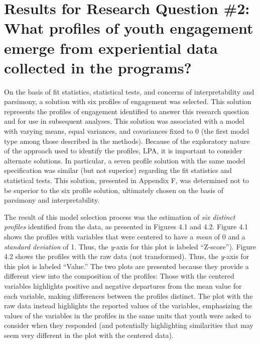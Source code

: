 \documentclass[]{msu-thesis}
\theoremstyle{definition}
\theoremstyle{definition}
\theoremstyle{definition}
\theoremstyle{remark}
\begin{document}
\section{Results for Research Question \#2: What profiles of youth
engagement emerge from experiential data collected in the
programs?}\label{results-for-research-question-2-what-profiles-of-youth-engagement-emerge-from-experiential-data-collected-in-the-programs}

On the basis of fit statistics, statistical tests, and concerns of
interpretability and parsimony, a solution with six profiles of
engagement was selected. This solution represents the profiles of
engagement identified to answer this research question and for use in
subsequent analyses. This solution was associated with a model with
varying means, equal variances, and covariances fixed to 0 (the first
model type among those described in the methods). Because of the
exploratory nature of the approach used to identify the profiles, LPA,
it is important to consider alternate solutions. In particular, a seven
profile solution with the same model specification was similar (but not
superior) regarding the fit statistics and statistical tests. This
solution, presented in Appendix F, was determined not to be superior to
the six profile solution, ultimately chosen on the basis of parsimony
and interpretability.

The result of this model selection process was the estimation of
\emph{six distinct profiles} identified from the data, as presented in
Figures 4.1 and 4.2. Figure 4.1 shows the profiles with variables that
were centered to have a \emph{mean} of 0 and a \emph{standard deviation}
of 1. Thus, the \emph{y}-axis for this plot is labeled ``Z-score'').
Figure 4.2 shows the profiles with the raw data (not transformed). Thus,
the \emph{y}-axis for this plot is labeled ``Value.'' The two plots are
presented because they provide a different view into the composition of
the profiles: Those with the centered variables highlights positive and
negative departures from the mean value for each variable, making
differences between the profiles distinct. The plot with the raw data
instead highlights the reported values of the variables, emphasizing the
values of the variables in the profiles in the same units that youth
were asked to consider when they responded (and potentially highlighting
similarities that may seem very different in the plot with the centered
data).
\end{document}
